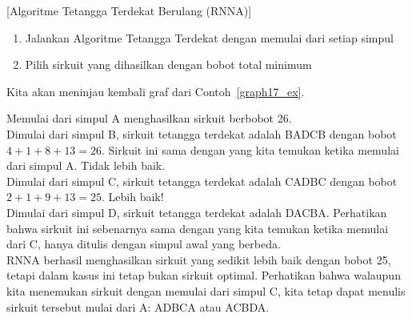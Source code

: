 \begin{algorithm}{}{}[Algoritme Tetangga Terdekat Berulang (RNNA)]
\hspace{3in}
\begin{enumerate}
\item	Jalankan Algoritme Tetangga Terdekat dengan memulai dari setiap simpul
\item	Pilih sirkuit yang dihasilkan dengan bobot total minimum
\end{enumerate}
\end{algorithm}

\begin{example}{} %
Kita akan meninjau kembali graf dari Contoh~\ref{graph17_ex}.\\
\begin{center}
\end{center}

Memulai dari simpul A menghasilkan sirkuit berbobot 26.\\

Dimulai dari simpul B, sirkuit tetangga terdekat adalah BADCB dengan bobot $4+1+8+13 = 26$.  Sirkuit ini sama dengan yang kita temukan ketika memulai dari simpul A.  Tidak lebih baik.\\

Dimulai dari simpul C, sirkuit tetangga terdekat adalah CADBC dengan bobot $2+1+9+13 = 25$.  Lebih baik!\\

Dimulai dari simpul D, sirkuit tetangga terdekat adalah DACBA.  Perhatikan bahwa sirkuit ini sebenarnya sama dengan yang kita temukan ketika memulai dari C, hanya ditulis dengan simpul awal yang berbeda.\\

RNNA berhasil menghasilkan sirkuit yang sedikit lebih baik dengan bobot 25, tetapi dalam kasus ini tetap bukan sirkuit optimal.  Perhatikan bahwa walaupun kita menemukan sirkuit dengan memulai dari simpul C, kita tetap dapat menulis sirkuit tersebut mulai dari A: ADBCA atau ACBDA.
\end{example}


